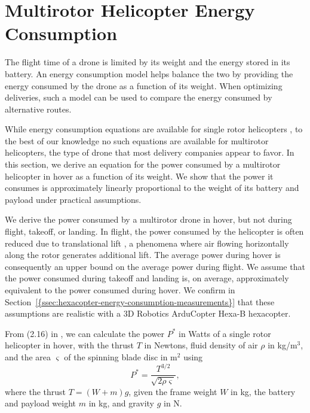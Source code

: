 \documentclass[journal]{IEEEtran}
\begin{document}
\section{Multirotor Helicopter Energy Consumption}
\label{sec:energy-consumption-model}

The flight time of a drone is limited by its weight and the energy stored in its battery. An energy consumption model helps balance the two by providing the energy consumed by the drone as a function of its weight. When optimizing deliveries, such a model can be used to compare the energy consumed by alternative routes.

While energy consumption equations are available for single rotor helicopters \cite{Leishman2002}, to the best of our knowledge no such equations are available for multirotor helicopters, the type of drone that most delivery companies appear to favor. In this section, we derive an equation for the power consumed by a multirotor helicopter in hover as a function of its weight. We show that the power it consumes is approximately linearly proportional to the  weight of its battery and payload under practical assumptions.

We derive the power consumed by a multirotor drone in hover, but not during flight, takeoff, or landing. In flight, the power consumed by the helicopter is often reduced due to translational lift \cite{Leishman2002}, a phenomena where air flowing horizontally along the rotor generates additional lift. The average power during hover is consequently an upper bound on the average power during flight. We assume that the power consumed during takeoff and landing is, on average, approximately equivalent to the power consumed during hover. We confirm in {Section~\ref{{ssec:hexacopter-energy-consumption-measurements}}} that these assumptions are realistic with a 3D Robotics ArduCopter Hexa-B hexacopter.

From (2.16) in \cite{Leishman2002}, we can calculate the power ${\ensuremath{P}}^*$ in Watts of a single rotor helicopter in hover, with the thrust ${\ensuremath{T}}$ in Newtons, fluid density of air ${\ensuremath{\rho}}$ in kg/m$^3$, and the area ${\ensuremath{\varsigma}}$ of the spinning blade disc in m$^2$ using
\begin{equation}
\label{eq:heli-power-vs-thrust}
{\ensuremath{P^*}} = \frac{ {\ensuremath{T}}^{3/2} }{\sqrt{2 {\ensuremath{\rho}} {\ensuremath{\varsigma}}}},
\end{equation}
where the thrust ${\ensuremath{T}} = ({\ensuremath{W}}+{\ensuremath{m}}) {\ensuremath{g}}$, given the frame weight ${\ensuremath{W}}$ in kg, the battery and payload weight ${\ensuremath{m}}$ in kg, and gravity ${\ensuremath{g}}$ in N.
\end{document}
